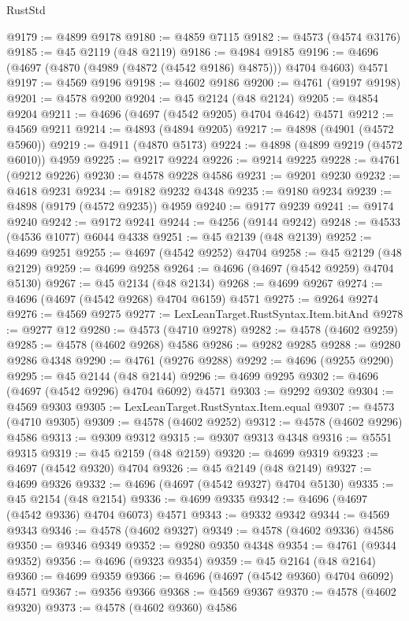 \begin{lexlean}{RustStd}
\begin{coremodule}
@9179 := @4899 @9178
@9180 := @4859 @7115
@9182 := @4573 (@4574 @3176)
@9185 := @45 @2119 (@48 @2119)
@9186 := @4984 @9185
@9196 := @4696 (@4697 (@4870 (@4989 (@4872 (@4542 @9186) @4875))) @4704 @4603) @4571
@9197 := @4569 @9196
@9198 := @4602 @9186
@9200 := @4761 (@9197 @9198)
@9201 := @4578 @9200
@9204 := @45 @2124 (@48 @2124)
@9205 := @4854 @9204
@9211 := @4696 (@4697 (@4542 @9205) @4704 @4642) @4571
@9212 := @4569 @9211
@9214 := @4893 (@4894 @9205)
@9217 := @4898 (@4901 (@4572 @5960))
@9219 := @4911 (@4870 @5173)
@9224 := @4898 (@4899 @9219 (@4572 @6010)) @4959
@9225 := @9217 @9224
@9226 := @9214 @9225
@9228 := @4761 (@9212 @9226)
@9230 := @4578 @9228 @4586
@9231 := @9201 @9230
@9232 := @4618 @9231
@9234 := @9182 @9232 @4348
@9235 := @9180 @9234
@9239 := @4898 (@9179 (@4572 @9235)) @4959
@9240 := @9177 @9239
@9241 := @9174 @9240
@9242 := @9172 @9241
@9244 := @4256 (@9144 @9242)
@9248 := @4533 (@4536 @1077) @6044 @4338
@9251 := @45 @2139 (@48 @2139)
@9252 := @4699 @9251
@9255 := @4697 (@4542 @9252) @4704
@9258 := @45 @2129 (@48 @2129)
@9259 := @4699 @9258
@9264 := @4696 (@4697 (@4542 @9259) @4704 @5130)
@9267 := @45 @2134 (@48 @2134)
@9268 := @4699 @9267
@9274 := @4696 (@4697 (@4542 @9268) @4704 @6159) @4571
@9275 := @9264 @9274
@9276 := @4569 @9275
@9277 := LexLeanTarget.RustSyntax.Item.bitAnd
@9278 := @9277 @12
@9280 := @4573 (@4710 @9278)
@9282 := @4578 (@4602 @9259)
@9285 := @4578 (@4602 @9268) @4586
@9286 := @9282 @9285
@9288 := @9280 @9286 @4348
@9290 := @4761 (@9276 @9288)
@9292 := @4696 (@9255 @9290)
@9295 := @45 @2144 (@48 @2144)
@9296 := @4699 @9295
@9302 := @4696 (@4697 (@4542 @9296) @4704 @6092) @4571
@9303 := @9292 @9302
@9304 := @4569 @9303
@9305 := LexLeanTarget.RustSyntax.Item.equal
@9307 := @4573 (@4710 @9305)
@9309 := @4578 (@4602 @9252)
@9312 := @4578 (@4602 @9296) @4586
@9313 := @9309 @9312
@9315 := @9307 @9313 @4348
@9316 := @5551 @9315
@9319 := @45 @2159 (@48 @2159)
@9320 := @4699 @9319
@9323 := @4697 (@4542 @9320) @4704
@9326 := @45 @2149 (@48 @2149)
@9327 := @4699 @9326
@9332 := @4696 (@4697 (@4542 @9327) @4704 @5130)
@9335 := @45 @2154 (@48 @2154)
@9336 := @4699 @9335
@9342 := @4696 (@4697 (@4542 @9336) @4704 @6073) @4571
@9343 := @9332 @9342
@9344 := @4569 @9343
@9346 := @4578 (@4602 @9327)
@9349 := @4578 (@4602 @9336) @4586
@9350 := @9346 @9349
@9352 := @9280 @9350 @4348
@9354 := @4761 (@9344 @9352)
@9356 := @4696 (@9323 @9354)
@9359 := @45 @2164 (@48 @2164)
@9360 := @4699 @9359
@9366 := @4696 (@4697 (@4542 @9360) @4704 @6092) @4571
@9367 := @9356 @9366
@9368 := @4569 @9367
@9370 := @4578 (@4602 @9320)
@9373 := @4578 (@4602 @9360) @4586

\end{coremodule}
\end{lexlean}
